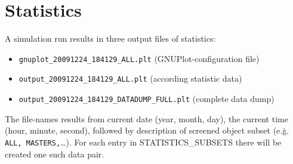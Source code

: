 \documentclass[a4paper,halfparskip,11pt,twoside]{scrartcl}
\begin{document}
\section{Statistics}
A simulation run results in three output files of statistics:

\begin{itemize}
\item \texttt{gnuplot\_20091224\_184129\_ALL.plt} (GNUPlot-configuration file)
\item \texttt{output\_20091224\_184129\_ALL.plt} (according statistic data)
\item \texttt{output\_20091224\_184129\_DATADUMP\_FULL.plt} (complete data dump)
\end{itemize}

The file-names results from current date (year, month, day), the current time (hour, minute, second), followed by description of screened object subset (e.\.g. \texttt{ALL, MASTERS,}\dots). For each entry in STATISTICS\_SUBSETS there will be created one such data pair.

\newpage
\appendix

	\newpage


\newpage
\thispagestyle{empty}
~
\end{document}
